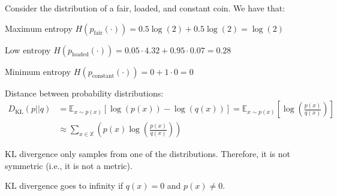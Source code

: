 \begin{description}
        \begin{example}
            Consider the distribution of a fair, loaded, and constant coin. We have that:
            \begin{descriptionlist}
                \item[Maximum entropy] $H(p_\text{fair}(\cdot)) = 0.5 \log(2) + 0.5 \log(2) = \log(2)$
                \item[Low entropy] $H(p_\text{loaded}(\cdot)) = 0.05 \cdot 4.32 + 0.95 \cdot 0.07 = 0.28$
                \item[Minimum entropy] $H(p_\text{constant}(\cdot)) = 0 + 1 \cdot 0 = 0$
            \end{descriptionlist}
        \end{example}

    \item[Kullback-Leibler (KL) divergence] 
        Distance between probability distributions:
        \[ 
            \begin{split}
                D_\text{KL}(p || q) &= \mathbb{E}_{x \sim p(x)}\left[ \log(p(x)) - \log(q(x)) \right] = \mathbb{E}_{x \sim p(x)} \left[ \log\left( \frac{p(x)}{q(x)} \right) \right] \\ 
                &\approx \sum_{x \in \mathbb{X}} \left( p(x) \log\left( \frac{p(x)}{q(x)} \right) \right) 
            \end{split}
        \]

        \begin{remark}
            KL divergence only samples from one of the distributions. Therefore, it is not symmetric (i.e., it is not a metric).
        \end{remark}

        \begin{remark}
            KL divergence goes to infinity if $q(x) = 0$ and $p(x) \neq 0$.
        \end{remark}


\end{description}
